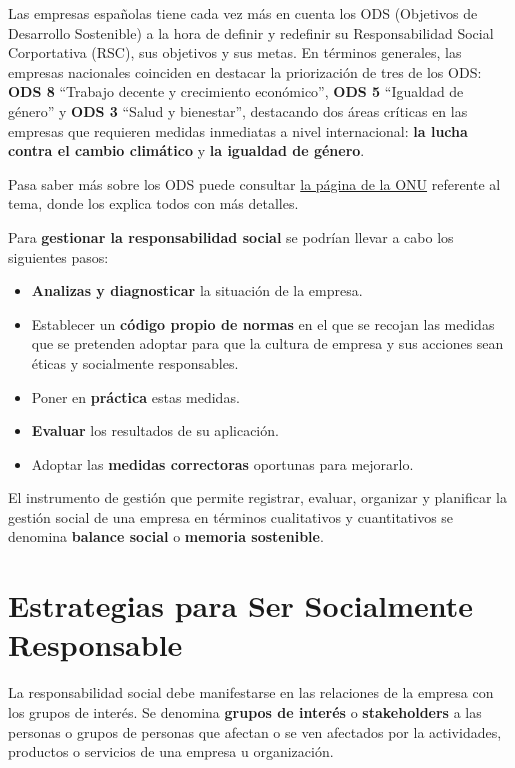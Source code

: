 Las empresas españolas tiene cada vez más en cuenta los ODS (Objetivos de Desarrollo Sostenible) a la hora de definir y redefinir su Responsabilidad Social Corportativa (RSC), sus objetivos y sus metas. En términos generales, las empresas nacionales coinciden en destacar la priorización de tres de los ODS: \textbf{ODS 8} ``Trabajo decente y crecimiento económico'', \textbf{ODS 5} ``Igualdad de género'' y \textbf{ODS 3} ``Salud y bienestar'', destacando dos áreas críticas en las empresas que requieren medidas inmediatas  a nivel internacional: \textbf{la lucha contra el cambio climático} y \textbf{la igualdad de género}.

Pasa saber más sobre los ODS puede consultar \href{https://www.pactomundial.org/noticia/10-principios-17-ods/}{la página de la ONU} referente al tema, donde los explica todos con más detalles.

Para \textbf{gestionar la responsabilidad social} se podrían llevar a cabo los siguientes pasos:

\begin{itemize}
    \item \textbf{Analizas y diagnosticar} la situación de la empresa.
    \item Establecer un \textbf{código propio de normas} en el que se recojan las medidas que se pretenden adoptar para que la cultura de empresa y sus acciones sean éticas y socialmente responsables.
    \item Poner en \textbf{práctica} estas medidas.
    \item \textbf{Evaluar} los resultados de su aplicación.
    \item Adoptar las \textbf{medidas correctoras} oportunas para mejorarlo.
\end{itemize}

El instrumento de gestión que permite registrar, evaluar, organizar y planificar la gestión social de una empresa en términos cualitativos y cuantitativos se denomina \textbf{balance social} o \textbf{memoria sostenible}.

\section{Estrategias para Ser Socialmente Responsable}
La responsabilidad social debe manifestarse en las relaciones de la empresa con los grupos de interés. Se denomina \textbf{grupos de interés} o \textbf{stakeholders} a las personas o grupos de personas que afectan o se ven afectados por la actividades, productos o servicios de una empresa u organización.

